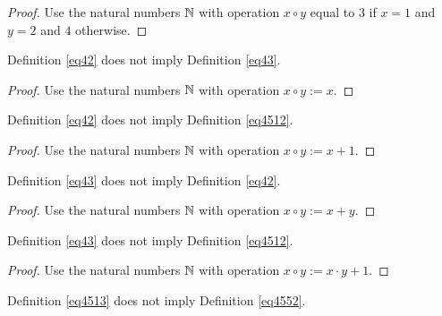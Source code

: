 \begin{proof} Use the natural numbers $\mathbb{N}$ with operation $x \circ y$ equal to $3$ if $x=1$ and $y=2$ and $4$ otherwise.
\end{proof}

\begin{theorem}\label{42_not_imply_43}\leanok{} Definition \ref{eq42} does not imply Definition \ref{eq43}.
\end{theorem}

\begin{proof} Use the natural numbers $\mathbb{N}$ with operation $x \circ y := x$.
\end{proof}

\begin{theorem}\label{42_not_imply_4512}\leanok{} Definition \ref{eq42} does not imply Definition \ref{eq4512}.
\end{theorem}

\begin{proof} Use the natural numbers $\mathbb{N}$ with operation $x \circ y := x+1$.
\end{proof}

\begin{theorem}\label{43_not_imply_42}\leanok{} Definition \ref{eq43} does not imply Definition \ref{eq42}.
\end{theorem}

\begin{proof} Use the natural numbers $\mathbb{N}$ with operation $x \circ y := x+y$.
\end{proof}

\begin{theorem}\label{43_not_imply_4512}\leanok{} Definition \ref{eq43} does not imply Definition \ref{eq4512}.
\end{theorem}

\begin{proof} Use the natural numbers $\mathbb{N}$ with operation $x \circ y := x \cdot y + 1$.
\end{proof}

\begin{theorem}\label{4513_not_imply_4552}\leanok{} Definition \ref{eq4513} does not imply Definition \ref{eq4552}.
\end{theorem}

